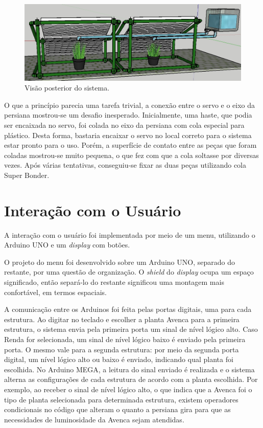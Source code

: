 \documentclass[a4paper,12pt]{report}
\begin{document}
	\begin{figure}[!h]
	\centering
	\includegraphics[width=1.0\linewidth]{figs/estru4}
	\caption{Visão posterior do sistema.}
	\label{fig:estru4}
	\end{figure}
	
	O que a princípio parecia uma tarefa trivial, a conexão entre o servo e o eixo da persiana mostrou-se um desafio inesperado. Inicialmente, uma haste, que podia ser encaixada no servo, foi colada no eixo da persiana com cola especial para plástico. Desta forma, bastaria encaixar o servo no local correto para o sistema estar pronto para o uso. Porém, a superfície de contato entre as peças que foram coladas mostrou-se muito pequena, o que fez com que a cola soltasse por diversas vezes. Após várias tentativas, conseguiu-se fixar as duas peças utilizando cola Super Bonder.
	
	\cleardoublepage
	\section{Interação com o Usuário}
	\label{sec:comunicaoArduinos}
	A interação com o usuário foi implementada por meio de um menu, utilizando o Arduino UNO e um \textit{display} com botões.
	
	O projeto do menu foi desenvolvido sobre um Arduino UNO, separado do restante, por uma questão de organização. O \textit{shield} do \textit{display} ocupa um espaço significado, então separá-lo do restante significou uma montagem mais confortável, em termos espaciais. 
	
	A comunicação entre os Arduinos foi feita pelas portas digitais, uma para cada estrutura. Ao digitar no teclado e escolher a planta Avenca para a primeira estrutura, o sistema envia pela primeira porta um sinal de nível lógico alto. Caso Renda for selecionada, um sinal de nível lógico baixo é enviado pela primeira porta. O mesmo vale para a segunda estrutura: por meio da segunda porta digital, um nível lógico alto ou baixo é enviado, indicando qual planta foi escolhida. 
	No Arduino MEGA, a leitura do sinal enviado é realizada e o sistema alterna as configurações de cada estrutura de acordo com a planta escolhida. Por exemplo, ao receber o sinal de nível lógico alto, o que indica que a Avenca foi o tipo de planta selecionada para determinada estrutura, existem operadores condicionais no código que alteram o quanto a persiana gira para que as necessidades de luminosidade da Avenca sejam atendidas. 
	
\end{document}
